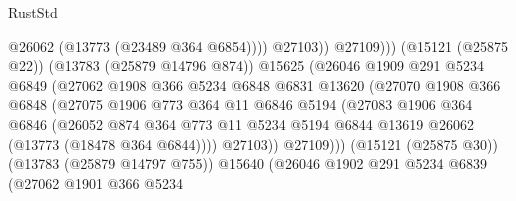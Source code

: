 \begin{lexlean}{RustStd}
\begin{coremodule}
                                            @26062
                                            (@13773 (@23489 @364 @6854))))
                                        @27103))
                                    @27109)))
                              (@15121 (@25875 @22))
                              (@13783 (@25879 @14796 @874))
                              @15625
                              (@26046
                                @1909
                                @291
                                @5234
                                @6849
                                (@27062
                                  @1908
                                  @366
                                  @5234
                                  @6848
                                  @6831
                                  @13620
                                  (@27070
                                    @1908
                                    @366
                                    @6848
                                    (@27075
                                      @1906
                                      @773
                                      @364
                                      @11
                                      @6846
                                      @5194
                                      (@27083
                                        @1906
                                        @364
                                        @6846
                                        (@26052
                                          @874
                                          @364
                                          @773
                                          @11
                                          @5234
                                          @5194
                                          @6844
                                          @13619
                                          @26062
                                          (@13773 (@18478 @364 @6844))))
                                      @27103))
                                  @27109)))
                            (@15121 (@25875 @30))
                            (@13783 (@25879 @14797 @755))
                            @15640
                            (@26046
                              @1902
                              @291
                              @5234
                              @6839
                              (@27062
                                @1901
                                @366
                                @5234

\end{coremodule}
\end{lexlean}
